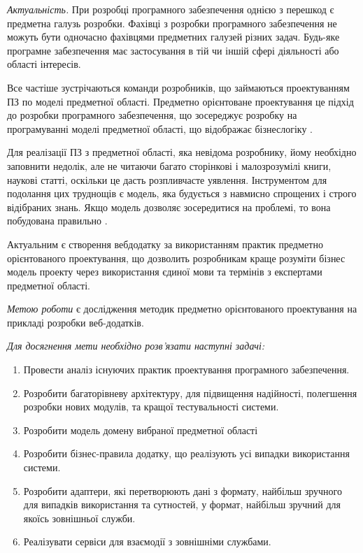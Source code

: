
\emph{Актуальність.} При розробці програмного забезпечення однією з перешкод
є предметна галузь розробки. Фахівці з розробки програмного забезпечення
не можуть бути одночасно фахівцями предметних галузей різних задач.
Будь-яке програмне забезпечення має застосування в
тій чи іншій сфері діяльності або області інтересів.

Все частіше зустрічаються команди розробників, що займаються проектуванням
ПЗ по моделі предметної області. Предметно орієнтоване проектування це
підхід до розробки програмного забезпечення, що зосереджує розробку
на програмуванні моделі предметної області, що відображає бізнес­логіку 
\cite{ddd-evans, ddd-vernon, agile-book, scrum-guide, os-development, scrum-book}.

Для реалізації ПЗ з предметної області, яка невідома розробнику,
йому необхідно заповнити недолік, але не читаючи багато сторінкові
і малозрозумілі книги, наукові статті, оскільки це дасть розпливчасте уявлення.
Інструментом для подолання цих труднощів є модель,
яка будується з навмисно спрощених і строго відібраних знань.
Якщо модель дозволяє зосередитися на проблемі, то вона побудована правильно 
\cite{ddd-evans, ddd-vernon, agile-book, os-development}.

Актуальним є створення веб­додатку за використанням практик предметно орієнтованого проектування,
що дозволить розробникам краще розуміти бізнес модель проекту через використання
єдиної мови та термінів з експертами предметної області.

\emph{Метою роботи} є дослідження методик предметно орієнтованого проектування
на прикладі розробки веб-додатків.

\textit{Для досягнення мети необхідно розв'язати наступні задачі:}

\begin{enumerate}
  \item Провести аналіз існуючих практик проектування програмного забезпечення.
	\item Розробити багаторівневу архітектуру, для підвищення надійності,
		полегшення розробки нових модулів, та кращої тестувальності системи.
	\item Розробити модель домену вибраної предметної області
	\item Розробити бізнес-правила додатку, що реалізують усі випадки
		використання системи.
	\item Розробити адаптери, які перетворюють дані з формату,
		найбільш зручного для випадків використання та сутностей,
		у формат, найбільш зручний для якоїсь зовнішньої служби.
	\item Реалізувати сервіси для взаємодії з зовнішніми службами.
\end{enumerate}

